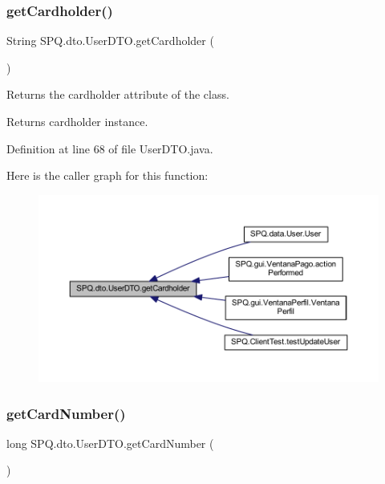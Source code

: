 \subsubsection{\texorpdfstring{get\+Cardholder()}{getCardholder()}}
{\footnotesize\ttfamily String S\+P\+Q.\+dto.\+User\+D\+T\+O.\+get\+Cardholder (\begin{DoxyParamCaption}{ }\end{DoxyParamCaption})}

Returns the cardholder attribute of the class. \begin{DoxyReturn}{Returns}
cardholder instance. 
\end{DoxyReturn}


Definition at line 68 of file User\+D\+T\+O.\+java.

Here is the caller graph for this function\+:\nopagebreak
\begin{figure}[H]
\begin{center}
\leavevmode
\includegraphics[width=350pt]{class_s_p_q_1_1dto_1_1_user_d_t_o_a82fe9a242f18d3cb62735cee648e71d9_icgraph}
\end{center}
\end{figure}
\mbox{\label{class_s_p_q_1_1dto_1_1_user_d_t_o_a6ffd8dce998a3e1756aa82e7b2981dd4}} 
\subsubsection{\texorpdfstring{get\+Card\+Number()}{getCardNumber()}}
{\footnotesize\ttfamily long S\+P\+Q.\+dto.\+User\+D\+T\+O.\+get\+Card\+Number (\begin{DoxyParamCaption}{ }\end{DoxyParamCaption})}

